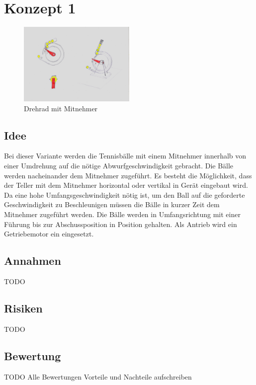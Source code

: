 \section{Konzept 1}
\begin{figure}[h!]
	\centering
	\includegraphics[width=0.5\textwidth]{../../fig/Drehrad_Mitnehmer.jpg}
	\caption{Drehrad mit Mitnehmer}
	\label{fig:mitnehmerrad_1}
\end{figure}
\subsection{Idee}
Bei dieser Variante werden die Tennisbälle mit einem Mitnehmer innerhalb von einer Umdrehung auf die nötige Abwurfgeschwindigkeit gebracht. Die Bälle werden nacheinander dem Mitnehmer zugeführt. Es besteht die Möglichkeit, dass der Teller mit dem Mitnehmer horizontal oder vertikal in Gerät eingebaut wird. Da eine hohe Umfangsgeschwindigkeit nötig ist, um den Ball auf die geforderte Geschwindigkeit zu Beschleunigen müssen die Bälle in kurzer Zeit dem Mitnehmer zugeführt werden. Die Bälle werden in Umfangsrichtung mit einer Führung bis zur Abschussposition in Position gehalten. Als Antrieb wird ein Getriebemotor ein eingesetzt.  
\subsection{Annahmen}
TODO

\subsection{Risiken}
TODO

\subsection{Bewertung}
TODO Alle Bewertungen
Vorteile und Nachteile aufschreiben